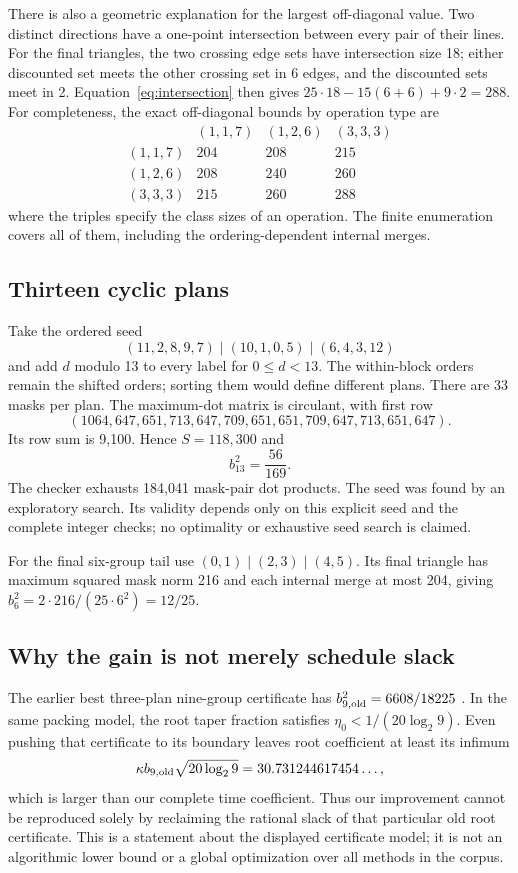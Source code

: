 There is also a geometric explanation for the largest off-diagonal value.
Two distinct directions have a one-point intersection between every pair
of their lines. For the final triangles, the two crossing edge sets have
intersection size 18; either discounted set meets the other crossing set
in 6 edges, and the discounted sets meet in 2. Equation~\eqref{eq:intersection}
then gives $25\cdot18-15(6+6)+9\cdot2=288$.
For completeness, the exact off-diagonal bounds by operation type are
\[
\begin{array}{c|rrr}
 & (1,1,7)&(1,2,6)&(3,3,3)\\\hline
 (1,1,7)&204&208&215\\
 (1,2,6)&208&240&260\\
 (3,3,3)&215&260&288
\end{array}
\]
where the triples specify the class sizes of an operation. The finite
enumeration covers all of them, including the ordering-dependent internal
merges.

\subsection{Thirteen cyclic plans}
Take the ordered seed
\[
 (11,2,8,9,7)\mid(10,1,0,5)\mid(6,4,3,12)
\]
and add $d$ modulo 13 to every label for $0\le d<13$. The within-block
orders remain the shifted orders; sorting them would define different
plans. There are 33 masks per plan. The maximum-dot matrix is circulant,
with first row
\[
 (1064,647,651,713,647,709,651,651,709,647,713,651,647).
\]
Its row sum is 9,100. Hence $S=118,300$ and
\begin{equation}\label{eq:b13}
 b_{13}^2=\frac{56}{169}.
\end{equation}
The checker exhausts 184,041 mask-pair dot products. The seed was found by
an exploratory search. Its validity depends only on this explicit seed
and the complete integer checks; no optimality or exhaustive seed search
is claimed.

For the final six-group tail use
$(0,1)\mid(2,3)\mid(4,5)$. Its final triangle has maximum squared mask
norm 216 and each internal merge at most 204, giving
$b_6^2=2\cdot216/(25\cdot6^2)=12/25$.

\subsection{Why the gain is not merely schedule slack}
The earlier best three-plan nine-group certificate has
$b_{9,\rm old}^2=6608/18225$ \cite{treecert}. In the same packing model,
the root taper fraction satisfies $\eta_0<1/(20\log_2 9)$. Even pushing
that certificate to its boundary leaves root coefficient at least its
infimum
\[
 \kappa b_{9,\rm old}\sqrt{20\log_2 9}
 =30.731244617454\ldots,
\]
which is larger than our complete time coefficient. Thus our improvement
cannot be reproduced solely by reclaiming the rational slack of that
particular old root certificate. This is a statement about the displayed
certificate model; it is not an algorithmic lower bound or a global
optimization over all methods in the corpus.
